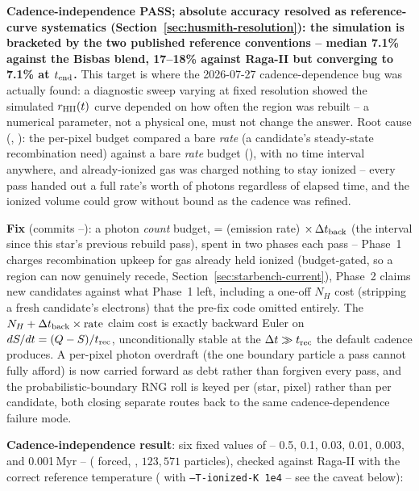 \textbf{Cadence-independence PASS; absolute accuracy resolved as
reference-curve systematics (Section~\ref{sec:husmith-resolution}): the
simulation is bracketed by the two published reference conventions --
median 7.1\% against the Bisbas blend, 17--18\% against Raga-II but
converging to 7.1\% at $t_{\rm end}$.} This target is where the
2026-07-27 cadence-dependence bug was actually found: a diagnostic
sweep varying  at fixed
resolution showed the simulated $r_{\rm HII}(t)$ curve depended on how
often the region was rebuilt -- a numerical parameter, not a physical
one, must not change the answer. Root cause
(, ): the
per-pixel budget compared a bare \emph{rate} (a candidate's steady-state
recombination need) against a bare \emph{rate} budget
(), with no time interval anywhere, and
already-ionized gas was charged nothing to stay ionized -- every pass
handed out a full rate's worth of photons regardless of elapsed time,
and the ionized volume could grow without bound as the cadence was
refined.

\textbf{Fix} (commits --): a photon
\emph{count} budget,  = (emission rate)
$\times\, \Delta t_{\rm back}$ (the interval since this star's previous
rebuild pass), spent in two phases each pass -- Phase~1 charges
recombination upkeep for gas already held ionized (budget-gated, so a
region can now genuinely recede, Section~\ref{sec:starbench-current}),
Phase~2 claims new candidates against what Phase~1 left, including a
one-off $N_H$ cost (stripping a fresh candidate's electrons) that the
pre-fix code omitted entirely. The $N_H+\Delta t_{\rm back}\times{\rm
rate}$ claim cost is exactly backward Euler on
$dS/dt=(Q-S)/t_{\rm rec}$, unconditionally stable at the $\Delta t
\gg t_{\rm rec}$ the default cadence produces. A per-pixel photon
overdraft (the one boundary particle a pass cannot fully afford) is now
carried forward as debt rather than forgiven every pass, and the
probabilistic-boundary RNG roll is keyed per (star, pixel) rather than
per candidate, both closing separate routes back to the same
cadence-dependence failure mode.

\textbf{Cadence-independence result}: six fixed values of
 -- 0.5, 0.1, 0.03, 0.01, 0.003, and
0.001\,Myr --
( forced, ,
$123{,}571$ particles), checked against Raga-II with the correct
reference temperature ( with
\texttt{--T-ionized-K 1e4} -- see the caveat below):

